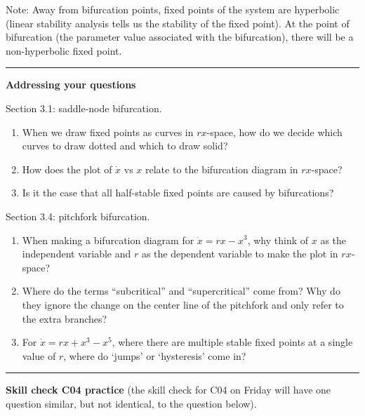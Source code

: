 \documentclass[12pt,letterpaper,noanswers]{exam}
\begin{document}
\noindent Note: Away from bifurcation points, fixed points of the system are hyperbolic (linear stability analysis tells us the stability of the fixed point).  At the point of bifurcation (the parameter value associated with the bifurcation), there will be a non-hyperbolic fixed point.

\vspace{0.2cm}

\hrule
\vspace{0.2cm}

\noindent\textbf{Addressing your questions}

Section 3.1: saddle-node bifurcation.
\begin{enumerate}
\itemsep-0.2em
    \item When we draw fixed points as curves in $rx$-space, how do we decide which curves to draw dotted and which to draw solid?  
    \item How does the plot of $\dot x$ vs $x$ relate to the bifurcation diagram in $rx$-space?
    \item Is it the case that all half-stable fixed points are caused by bifurcations?  
\end{enumerate}

\eject

Section 3.4: pitchfork bifurcation.
\begin{enumerate}
\itemsep-0.2em
    \item When making a bifurcation diagram for $\dot x = rx - x^3$, why think of $x$ as the independent variable and $r$ as the dependent variable to make the plot in $rx$-space?
    \item Where do the terms ``subcritical'' and ``supercritical'' come from?  Why do they ignore the change on the center line of the pitchfork and only refer to the extra branches?
    \item For $\dot x = r x + x^3 - x^5$, where there are multiple stable fixed points at a single value of $r$, where do `jumps' or `hysteresis' come in?
\end{enumerate}

\eject

\vspace{0.2cm}
\hrule
\vspace{0.2cm}

\noindent\textbf{Skill check C04 practice} (the skill check for C04 on Friday will have one question similar, but not identical, to the question below).
\end{document}
